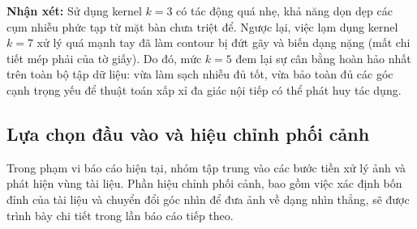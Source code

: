\documentclass[12pt, a4paper]{report}
\begin{document}
\textbf{Nhận xét:} 
Sử dụng kernel $k=3$ có tác động quá nhẹ, khả năng dọn dẹp các cụm nhiễu phức tạp từ mặt bàn chưa triệt để. Ngược lại, việc lạm dụng kernel $k=7$ xử lý quá mạnh tay đã làm contour bị đứt gãy và biến dạng nặng (mất chi tiết mép phải của tờ giấy). Do đó, mức $k=5$ đem lại sự cân bằng hoàn hảo nhất trên toàn bộ tập dữ liệu: vừa làm sạch nhiễu đủ tốt, vừa bảo toàn đủ các góc cạnh trọng yếu để thuật toán xấp xỉ đa giác nội tiếp có thể phát huy tác dụng.

\subsection{Lựa chọn đầu vào và hiệu chỉnh phối cảnh}

Trong phạm vi báo cáo hiện tại, nhóm tập trung vào các bước tiền xử lý ảnh và phát hiện vùng tài liệu. Phần hiệu chỉnh phối cảnh, bao gồm việc xác định bốn đỉnh của tài liệu và chuyển đổi góc nhìn để đưa ảnh về dạng nhìn thẳng, sẽ được trình bày chi tiết trong lần báo cáo tiếp theo.





\end{document}
